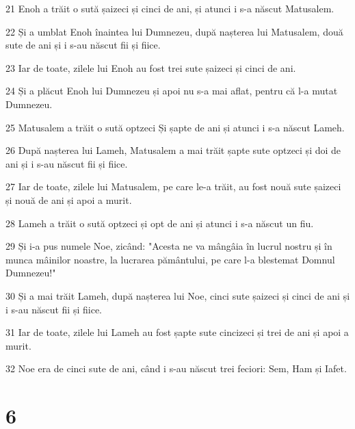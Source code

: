 \par 21 Enoh a trăit o sută șaizeci și cinci de ani, și atunci i s-a născut Matusalem.
\par 22 Și a umblat Enoh înaintea lui Dumnezeu, după nașterea lui Matusalem, două sute de ani și i s-au născut fii și fiice.
\par 23 Iar de toate, zilele lui Enoh au fost trei sute șaizeci și cinci de ani.
\par 24 Și a plăcut Enoh lui Dumnezeu și apoi nu s-a mai aflat, pentru că l-a mutat Dumnezeu.
\par 25 Matusalem a trăit o sută optzeci Și șapte de ani și atunci i s-a născut Lameh.
\par 26 După nașterea lui Lameh, Matusalem a mai trăit șapte sute optzeci și doi de ani și i s-au născut fii și fiice.
\par 27 Iar de toate, zilele lui Matusalem, pe care le-a trăit, au fost nouă sute șaizeci și nouă de ani și apoi a murit.
\par 28 Lameh a trăit o sută optzeci și opt de ani și atunci i s-a născut un fiu.
\par 29 Și i-a pus numele Noe, zicând: "Acesta ne va mângâia în lucrul nostru și în munca mâinilor noastre, la lucrarea pământului, pe care l-a blestemat Domnul Dumnezeu!"
\par 30 Și a mai trăit Lameh, după nașterea lui Noe, cinci sute șaizeci și cinci de ani și i s-au născut fii și fiice.
\par 31 Iar de toate, zilele lui Lameh au fost șapte sute cincizeci și trei de ani și apoi a murit.
\par 32 Noe era de cinci sute de ani, când i s-au născut trei feciori: Sem, Ham și Iafet.

\chapter{6}

